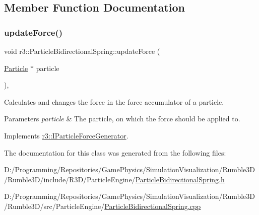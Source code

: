 \subsection{Member Function Documentation}
\mbox{\label{classr3_1_1_particle_bidirectional_spring_a13ac531b70d2884364fba66aae55b5fb}} 
\subsubsection{\texorpdfstring{update\+Force()}{updateForce()}}
{\footnotesize\ttfamily void r3\+::\+Particle\+Bidirectional\+Spring\+::update\+Force (\begin{DoxyParamCaption}\item[{\mbox{\hyperlink{classr3_1_1_particle}{Particle}} $\ast$}]{particle }\end{DoxyParamCaption})\hspace{0.3cm}{\ttfamily [override]}, {\ttfamily [virtual]}}



Calculates and changes the force in the force accumulator of a particle. 


\begin{DoxyParams}{Parameters}
{\em particle} & The particle, on which the force should be applied to. \\
\hline
\end{DoxyParams}


Implements \mbox{\hyperlink{classr3_1_1_i_particle_force_generator_af705063c5d7debca0f7a5c5c68c28f50}{r3\+::\+I\+Particle\+Force\+Generator}}.



The documentation for this class was generated from the following files\+:\begin{DoxyCompactItemize}
\item 
D\+:/\+Programming/\+Repositories/\+Game\+Physics/\+Simulation\+Visualization/\+Rumble3\+D/\+Rumble3\+D/include/\+R3\+D/\+Particle\+Engine/\mbox{\hyperlink{_particle_bidirectional_spring_8h}{Particle\+Bidirectional\+Spring.\+h}}\item 
D\+:/\+Programming/\+Repositories/\+Game\+Physics/\+Simulation\+Visualization/\+Rumble3\+D/\+Rumble3\+D/src/\+Particle\+Engine/\mbox{\hyperlink{_particle_bidirectional_spring_8cpp}{Particle\+Bidirectional\+Spring.\+cpp}}\end{DoxyCompactItemize}
